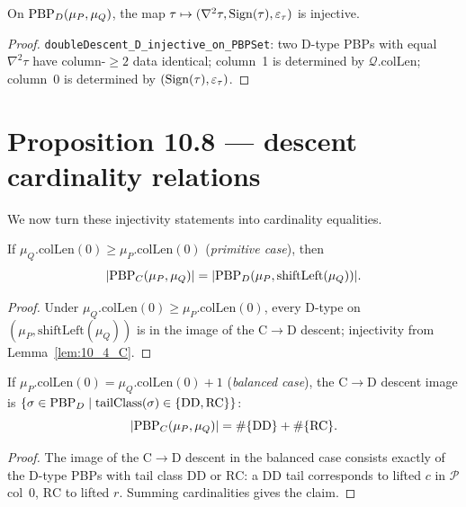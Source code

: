 \begin{lemma}
  \label{lem:10_5_D}
  \leanok
  On $\mathrm{PBP}_D(\mu_P, \mu_Q)$, the map $\tau \mapsto (\nabla^2\tau, \mathrm{Sign}(\tau), \varepsilon_\tau)$ is injective.
\end{lemma}
\begin{proof}
  \leanok
  \texttt{doubleDescent\_D\_injective\_on\_PBPSet}: two D-type PBPs with equal $\nabla^2\tau$ have column-$\geq 2$ data identical; column~1 is determined by $\mathcal{Q}.\mathrm{colLen}$; column~0 is determined by $(\mathrm{Sign}(\tau), \varepsilon_\tau)$.
\end{proof}


\section{Proposition 10.8 — descent cardinality relations}

We now turn these injectivity statements into cardinality equalities.

\begin{proposition}
  \label{prop:10_8_C_prim}
  \leanok
  If $\mu_Q.\mathrm{colLen}(0) \geq \mu_P.\mathrm{colLen}(0)$ (\emph{primitive case}), then
  \[ |\mathrm{PBP}_C(\mu_P, \mu_Q)| = |\mathrm{PBP}_D(\mu_P, \mathrm{shiftLeft}(\mu_Q))|. \]
\end{proposition}
\begin{proof}
  \leanok
  Under $\mu_Q.\mathrm{colLen}(0) \geq \mu_P.\mathrm{colLen}(0)$, every D-type on $(\mu_P, \mathrm{shiftLeft}(\mu_Q))$ is in the image of the C$\to$D descent; injectivity from Lemma~\ref{lem:10_4_C}.
\end{proof}


\begin{proposition}
  \label{prop:10_8_C_bal}
  \leanok
  If $\mu_P.\mathrm{colLen}(0) = \mu_Q.\mathrm{colLen}(0) + 1$ (\emph{balanced case}), the C$\to$D descent image is $\{\sigma \in \mathrm{PBP}_D \mid \mathrm{tailClass}(\sigma) \in \{\mathrm{DD}, \mathrm{RC}\}\}$:
  \[ |\mathrm{PBP}_C(\mu_P, \mu_Q)| = \#\{\mathrm{DD}\} + \#\{\mathrm{RC}\}. \]
\end{proposition}
\begin{proof}
  \leanok
  The image of the C$\to$D descent in the balanced case consists exactly of the D-type PBPs with tail class $\mathrm{DD}$ or $\mathrm{RC}$: a $\mathrm{DD}$ tail corresponds to lifted $c$ in $\mathcal{P}$ col~0, $\mathrm{RC}$ to lifted $r$. Summing cardinalities gives the claim.
\end{proof}


